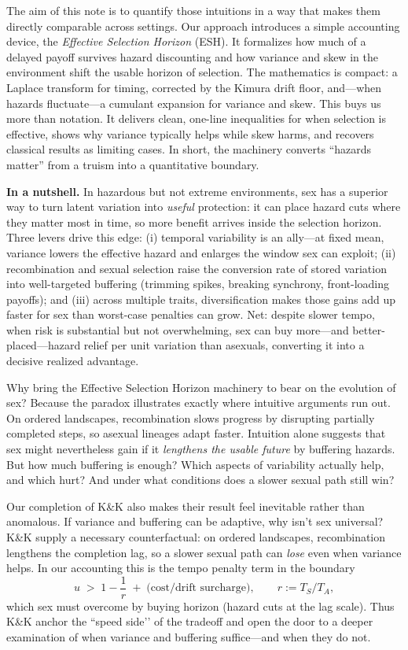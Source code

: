 \documentclass[11pt]{article}
\theoremstyle{upright}
\begin{document}
The aim of this note is to quantify those intuitions in a way that makes them
directly comparable across settings. Our approach
introduces a simple accounting device, the \emph{Effective Selection Horizon}
(ESH). It formalizes how much of a delayed payoff survives hazard discounting
and how variance and skew in the environment shift the usable horizon of
selection. The mathematics is compact: a Laplace transform for timing,
corrected by the Kimura drift floor, and---when hazards fluctuate---a cumulant expansion
for variance and skew. This buys us more than notation. It delivers clean,
one-line inequalities for when selection is effective, shows why variance
typically helps while skew harms, and recovers classical results as limiting
cases. In short, the machinery converts “hazards matter” from a truism into a
quantitative boundary.

\begin{framed}
\textbf{In a nutshell.}
In hazardous but not extreme environments, sex has a superior way to turn latent variation into \emph{useful} protection: it can place hazard cuts where they matter most in time, so more benefit arrives inside the selection horizon. Three levers drive this edge: (i) temporal variability is an ally—at fixed mean, variance lowers the effective hazard and enlarges the window sex can exploit; (ii) recombination and sexual selection raise the conversion rate of stored variation into well-targeted buffering (trimming spikes, breaking synchrony, front-loading payoffs); and (iii) across multiple traits, diversification makes those gains add up faster for sex than worst-case penalties can grow. Net: despite slower tempo, when risk is substantial but not overwhelming, sex can buy more—and better-placed—hazard relief per unit variation than asexuals, converting it into a decisive realized advantage.
\end{framed}

Why bring the Effective Selection Horizon machinery to bear on the evolution of sex? Because the \citet{Kondrashov2001} 
paradox illustrates exactly where intuitive arguments run out.
On ordered landscapes, recombination slows progress by disrupting partially
completed steps, so asexual lineages adapt faster. Intuition alone suggests
that sex might nevertheless gain if it \emph{lengthens the usable future} by buffering hazards.
But how much buffering is enough? Which aspects of variability actually help,
and which hurt? And under what conditions does a slower sexual path still win?

Our completion of K\&K also makes their result feel inevitable rather than anomalous.
If variance and buffering can be adaptive, why isn’t sex universal?
K\&K supply a necessary counterfactual: on ordered landscapes, recombination 
lengthens the completion lag, so a slower sexual path can \emph{lose} even when variance helps.
In our accounting this is the tempo penalty term in the boundary
\[
u \;>\; 1-\frac{1}{r}\;+\;\text{(cost/drift surcharge)},
\qquad r:=T_S/T_A,
\]
which sex must overcome by buying horizon (hazard cuts at the lag scale).
Thus K\&K anchor the “speed side’’ of the tradeoff and open the door to a deeper 
examination of when variance and buffering suffice—and when they do not.
\end{document}
